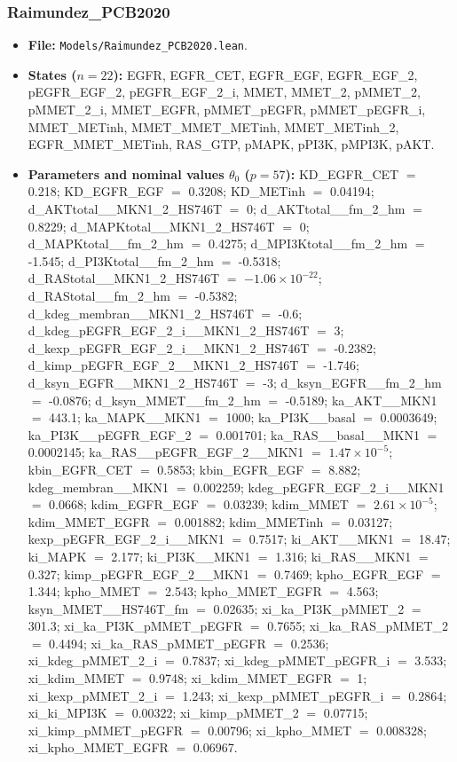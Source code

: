 \subsubsection*{Raimundez\_PCB2020}

\begin{itemize}\itemsep0pt\small
\item \textbf{File:} \texttt{Models/Raimundez\_PCB2020.lean}.
\item \textbf{States ($n=22$):} EGFR, EGFR\_CET, EGFR\_EGF, EGFR\_EGF\_2, pEGFR\_EGF\_2, pEGFR\_EGF\_2\_i, MMET, MMET\_2, pMMET\_2, pMMET\_2\_i, MMET\_EGFR, pMMET\_pEGFR, pMMET\_pEGFR\_i, MMET\_METinh, MMET\_MMET\_METinh, MMET\_METinh\_2, EGFR\_MMET\_METinh, RAS\_GTP, pMAPK, pPI3K, pMPI3K, pAKT.
\item \textbf{Parameters and nominal values $\theta_0$ ($p=57$):} KD\_EGFR\_CET $=$ 0.218; KD\_EGFR\_EGF $=$ 0.3208; KD\_METinh $=$ 0.04194; d\_AKTtotal\_\_MKN1\_2\_HS746T $=$ 0; d\_AKTtotal\_\_fm\_2\_hm $=$ 0.8229; d\_MAPKtotal\_\_MKN1\_2\_HS746T $=$ 0; d\_MAPKtotal\_\_fm\_2\_hm $=$ 0.4275; d\_MPI3Ktotal\_\_fm\_2\_hm $=$ -1.545; d\_PI3Ktotal\_\_fm\_2\_hm $=$ -0.5318; d\_RAStotal\_\_MKN1\_2\_HS746T $=$ $-1.06\times10^{-22}$; d\_RAStotal\_\_fm\_2\_hm $=$ -0.5382; d\_kdeg\_membran\_\_MKN1\_2\_HS746T $=$ -0.6; d\_kdeg\_pEGFR\_EGF\_2\_i\_\_MKN1\_2\_HS746T $=$ 3; d\_kexp\_pEGFR\_EGF\_2\_i\_\_MKN1\_2\_HS746T $=$ -0.2382; d\_kimp\_pEGFR\_EGF\_2\_\_MKN1\_2\_HS746T $=$ -1.746; d\_ksyn\_EGFR\_\_MKN1\_2\_HS746T $=$ -3; d\_ksyn\_EGFR\_\_fm\_2\_hm $=$ -0.0876; d\_ksyn\_MMET\_\_fm\_2\_hm $=$ -0.5189; ka\_AKT\_\_MKN1 $=$ 443.1; ka\_MAPK\_\_MKN1 $=$ 1000; ka\_PI3K\_\_basal $=$ 0.0003649; ka\_PI3K\_\_pEGFR\_EGF\_2 $=$ 0.001701; ka\_RAS\_\_basal\_\_MKN1 $=$ 0.0002145; ka\_RAS\_\_pEGFR\_EGF\_2\_\_MKN1 $=$ $1.47\times10^{-5}$; kbin\_EGFR\_CET $=$ 0.5853; kbin\_EGFR\_EGF $=$ 8.882; kdeg\_membran\_\_MKN1 $=$ 0.002259; kdeg\_pEGFR\_EGF\_2\_i\_\_MKN1 $=$ 0.0668; kdim\_EGFR\_EGF $=$ 0.03239; kdim\_MMET $=$ $2.61\times10^{-5}$; kdim\_MMET\_EGFR $=$ 0.001882; kdim\_MMETinh $=$ 0.03127; kexp\_pEGFR\_EGF\_2\_i\_\_MKN1 $=$ 0.7517; ki\_AKT\_\_MKN1 $=$ 18.47; ki\_MAPK $=$ 2.177; ki\_PI3K\_\_MKN1 $=$ 1.316; ki\_RAS\_\_MKN1 $=$ 0.327; kimp\_pEGFR\_EGF\_2\_\_MKN1 $=$ 0.7469; kpho\_EGFR\_EGF $=$ 1.344; kpho\_MMET $=$ 2.543; kpho\_MMET\_EGFR $=$ 4.563; ksyn\_MMET\_\_HS746T\_fm $=$ 0.02635; xi\_ka\_PI3K\_pMMET\_2 $=$ 301.3; xi\_ka\_PI3K\_pMMET\_pEGFR $=$ 0.7655; xi\_ka\_RAS\_pMMET\_2 $=$ 0.4494; xi\_ka\_RAS\_pMMET\_pEGFR $=$ 0.2536; xi\_kdeg\_pMMET\_2\_i $=$ 0.7837; xi\_kdeg\_pMMET\_pEGFR\_i $=$ 3.533; xi\_kdim\_MMET $=$ 0.9748; xi\_kdim\_MMET\_EGFR $=$ 1; xi\_kexp\_pMMET\_2\_i $=$ 1.243; xi\_kexp\_pMMET\_pEGFR\_i $=$ 0.2864; xi\_ki\_MPI3K $=$ 0.00322; xi\_kimp\_pMMET\_2 $=$ 0.07715; xi\_kimp\_pMMET\_pEGFR $=$ 0.00796; xi\_kpho\_MMET $=$ 0.008328; xi\_kpho\_MMET\_EGFR $=$ 0.06967.

\end{itemize}
